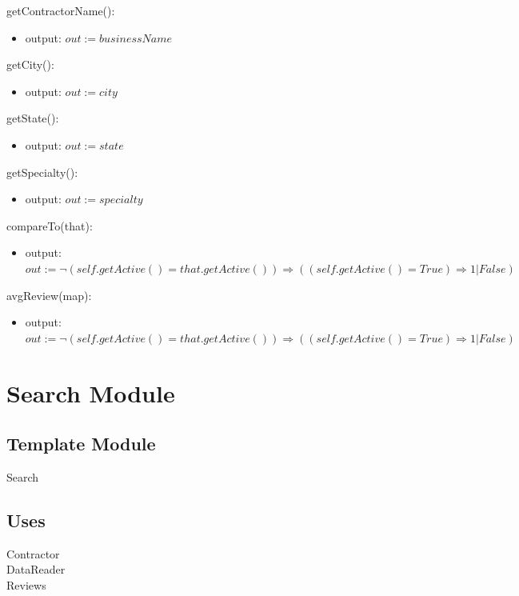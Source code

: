 \documentclass[12pt]{scrartcl}
\begin{document}
\noindent getContractorName():
\begin{itemize}
\item output: $out := businessName$
\end{itemize}

\noindent getCity():
\begin{itemize}
\item output: $out := city$
\end{itemize}

\noindent getState():
\begin{itemize}
\item output: $out := state$
\end{itemize}

\noindent getSpecialty():
\begin{itemize}
\item output: $out := specialty$
\end{itemize} 

\noindent compareTo(that):
\begin{itemize}
\item output: $out := \neg (self.getActive() = that.getActive()) \Rightarrow ((self.getActive() = True) \Rightarrow 1 | False) $ 
\end{itemize} 

\noindent avgReview(map):
\begin{itemize}
\item output: $out := \neg (self.getActive() = that.getActive()) \Rightarrow ((self.getActive() = True) \Rightarrow 1 | False) $ 
\end{itemize} 


\newpage

\section {Search Module}

\subsection{Template Module}

Search

\subsection {Uses}

Contractor \\
DataReader \\
Reviews
\end{document}
